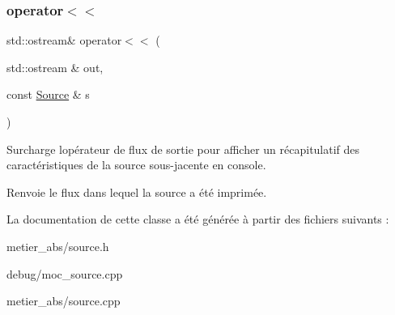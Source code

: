\subsubsection{\texorpdfstring{operator$<$$<$}{operator<<}}
{\footnotesize\ttfamily std\+::ostream\& operator$<$$<$ (\begin{DoxyParamCaption}\item[{std\+::ostream \&}]{out,  }\item[{const \mbox{\hyperlink{class_source}{Source}} \&}]{s }\end{DoxyParamCaption})\hspace{0.3cm}{\ttfamily [friend]}}

Surcharge l\textquotesingle{}opérateur de flux de sortie pour afficher un récapitulatif des caractéristiques de la source sous-\/jacente en console. \begin{DoxyReturn}{Renvoie}
le flux dans lequel la source a été imprimée. 
\end{DoxyReturn}


La documentation de cette classe a été générée à partir des fichiers suivants \+:\begin{DoxyCompactItemize}
\item 
metier\+\_\+abs/source.\+h\item 
debug/moc\+\_\+source.\+cpp\item 
metier\+\_\+abs/source.\+cpp\end{DoxyCompactItemize}
